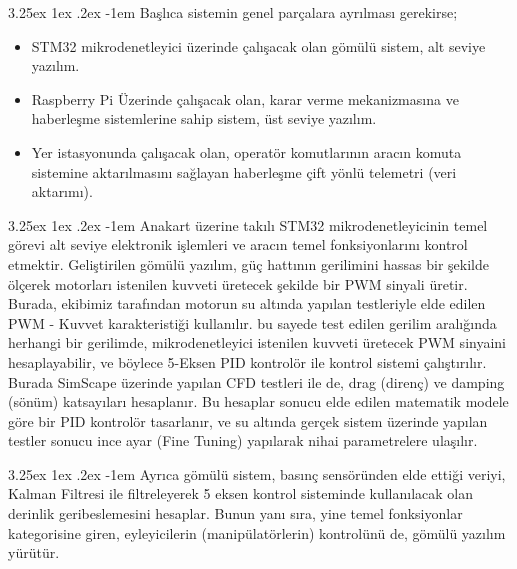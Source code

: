 \documentclass[12pt]{article}
\makeatletter
\newcounter{subsubsubsection}[subsubsection]
\renewcommand\paragraph{\@startsection{paragraph}{5}{\z@}%
  {3.25ex \@plus1ex \@minus.2ex}%
  {-1em}%
  {\normalfont\normalsize\bfseries}}
\makeatother
\begin{document}
\paragraph{} Başlıca sistemin genel parçalara ayrılması gerekirse;
\begin{itemize}
    \item STM32 mikrodenetleyici üzerinde çalışacak olan gömülü sistem, alt seviye yazılım.
    \item Raspberry Pi Üzerinde çalışacak olan, karar verme mekanizmasına ve haberleşme sistemlerine sahip sistem, üst seviye yazılım.
    \item Yer istasyonunda çalışacak olan, operatör komutlarının aracın komuta sistemine aktarılmasını sağlayan haberleşme çift yönlü telemetri (veri aktarımı).
\end{itemize}


 \paragraph{}  Anakart üzerine takılı STM32 mikrodenetleyicinin temel görevi alt seviye elektronik işlemleri ve aracın temel fonksiyonlarını kontrol etmektir. Geliştirilen gömülü yazılım, güç hattının gerilimini hassas bir şekilde ölçerek motorları istenilen kuvveti üretecek şekilde bir PWM sinyali üretir. Burada, ekibimiz tarafından motorun su altında yapılan testleriyle elde edilen PWM - Kuvvet karakteristiği kullanılır. bu sayede test edilen gerilim aralığında herhangi bir gerilimde, mikrodenetleyici istenilen kuvveti üretecek PWM sinyaini hesaplayabilir, ve böylece 5-Eksen PID kontrolör ile kontrol sistemi çalıştırılır. Burada SimScape üzerinde yapılan CFD testleri ile de, drag (direnç) ve damping (sönüm) katsayıları hesaplanır. Bu hesaplar sonucu elde edilen matematik modele göre bir PID kontrolör tasarlanır, ve su altında gerçek sistem üzerinde yapılan testler sonucu ince ayar (Fine Tuning) yapılarak nihai parametrelere ulaşılır. 

\paragraph{} Ayrıca gömülü sistem, basınç sensöründen elde ettiği veriyi, Kalman Filtresi ile filtreleyerek 5 eksen kontrol sisteminde kullanılacak olan derinlik geribeslemesini hesaplar. Bunun yanı sıra, yine temel fonksiyonlar kategorisine giren, eyleyicilerin (manipülatörlerin) kontrolünü de, gömülü yazılım yürütür.
\end{document}
